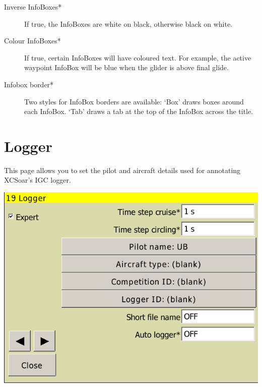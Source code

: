 \begin{description}
\item[Inverse InfoBoxes*]  If true, the InfoBoxes are white on black, otherwise black on white.
\item[Colour InfoBoxes*]  If true, certain InfoBoxes will have coloured text. For example, the 
active waypoint InfoBox will be blue when the glider is above final glide.
\item[Infobox border*]  Two styles for InfoBox borders are available: `Box'
draws boxes around each InfoBox.  `Tab' draws a tab at the top of the InfoBox across the title.
\end{description}


\clearpage
\section{Logger}

This page allows you to set the pilot and aircraft details used for
annotating XCSoar's IGC logger. 

\begin{center}
\includegraphics[angle=0,width=0.8\linewidth,keepaspectratio='true']{figures/config-logger.png}
\end{center}

